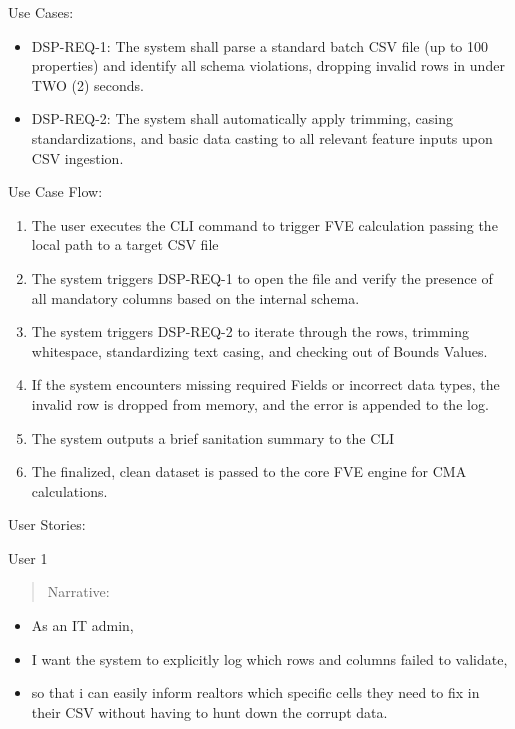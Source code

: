 Use Cases:

\begin{itemize}
\item
  DSP-REQ-1: The system shall parse a standard batch CSV file (up to 100
  properties) and identify all schema violations, dropping invalid rows
  in under TWO (2) seconds.
\item
  DSP-REQ-2: The system shall automatically apply trimming, casing
  standardizations, and basic data casting to all relevant feature
  inputs upon CSV ingestion.
\end{itemize}

Use Case Flow:

\begin{enumerate}
\def\labelenumi{\arabic{enumi})}
\item
  The user executes the CLI command to trigger FVE calculation passing
  the local path to a target CSV file
\item
  The system triggers DSP-REQ-1 to open the file and verify the presence
  of all mandatory columns based on the internal schema.
\item
  The system triggers DSP-REQ-2 to iterate through the rows, trimming
  whitespace, standardizing text casing, and checking out of Bounds
  Values.
\item
  If the system encounters missing required Fields or incorrect data
  types, the invalid row is dropped from memory, and the error is
  appended to the log.
\item
  The system outputs a brief sanitation summary to the CLI
\item
  The finalized, clean dataset is passed to the core FVE engine for CMA
  calculations.
\end{enumerate}

User Stories:

User 1

\begin{quote}
Narrative:
\end{quote}

\begin{itemize}
\item
  As an IT admin,
\item
  I want the system to explicitly log which rows and columns failed to
  validate,
\item
  so that i can easily inform realtors which specific cells they need to
  fix in their CSV without having to hunt down the corrupt data.
\end{itemize}

